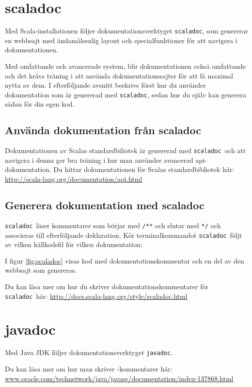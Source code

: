 \section{scaladoc}
\newcommand{\scaladoc}{\texttt{scaladoc}}

Med Scala-installationen följer dokumentationsverktyget \scaladoc, som genererar en webbsajt med ändamålsenlig layout och specialfunktioner för att navigera i dokumentationen. 

Med omfattande och avancerade system, blir dokumentationen också omfattande och det krävs träning i att använda dokumentationssajter för att få maximal nytta av dem. I efterföljande avsnitt beskrivs först hur du använder dokumentation som är genererad med \scaladoc, sedan hur du själv kan generera sådan för din egen kod.


\subsection{Använda dokumentation från scaladoc}

Dokumentationen av Scalas standardbiliotek är genererad med \scaladoc~och att navigera i denna ger bra träning i hur man använder avancerad api-dokumentation. Du hittar dokumentationen för Scalas standardbibliotek här: \\
\url{http://scala-lang.org/documentation/api.html}

\subsection{Generera dokumentation med scaladoc}

\scaladoc~läser kommentarer som börjar med \verb|/**| och slutar med \verb|*/| och associeras till efterföljande deklaration. Kör terminalkommandot \scaladoc~följt av vilken källkodsfil för vilken dokumentation:

I figur \ref{fig:scaladoc} visas kod med dokumentationskommentar och en del av den webbsajt som genereras.
 

Du kan läsa mer om hur du skriver dokumentationskommentarer för \scaladoc~här: 
\url{http://docs.scala-lang.org/style/scaladoc.html}



\section{javadoc}
\newcommand{\javadoc}{\texttt{javadoc}}

Med Java JDK följer dokumentationsverktyget \javadoc.

Du kan läsa mer om hur man skriver -kommentarer här:\\
\href{http://www.oracle.com/technetwork/java/javase/documentation/index-137868.html}{www.oracle.com/technetwork/java/javase/documentation/index-137868.html}